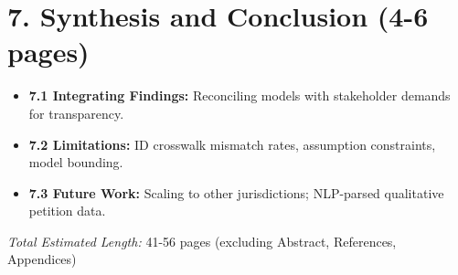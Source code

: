 \documentclass[11pt, letterpaper]{article}
\begin{document}
\section*{7. Synthesis and Conclusion (4-6 pages)}
\begin{itemize}[leftmargin=*, label={\color{columbiablue_official}\tiny$\square$}, parsep=2pt, itemsep=2pt, topsep=0pt]
    \item \textbf{7.1 Integrating Findings:} Reconciling models with stakeholder demands for transparency.
    \item \textbf{7.2 Limitations:} ID crosswalk mismatch rates, assumption constraints, model bounding.
    \item \textbf{7.3 Future Work:} Scaling to other jurisdictions; NLP-parsed qualitative petition data.
\end{itemize}

\vspace{1em}
\noindent\textit{Total Estimated Length:} 41-56 pages (excluding Abstract, References, Appendices)
\end{document}
